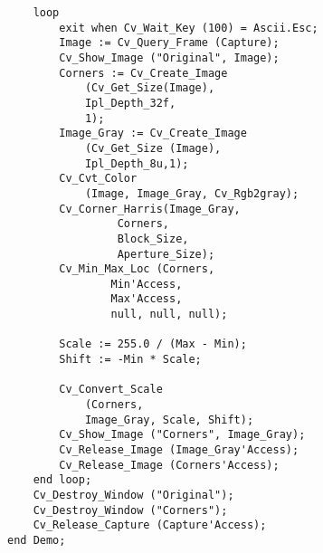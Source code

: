 \begin{lstlisting}
	loop
		exit when Cv_Wait_Key (100) = Ascii.Esc;
		Image := Cv_Query_Frame (Capture);
		Cv_Show_Image ("Original", Image);
		Corners := Cv_Create_Image
			(Cv_Get_Size(Image),
			Ipl_Depth_32f, 
			1);
		Image_Gray := Cv_Create_Image
			(Cv_Get_Size (Image),
			Ipl_Depth_8u,1);
		Cv_Cvt_Color
			(Image, Image_Gray, Cv_Rgb2gray);
		Cv_Corner_Harris(Image_Gray, 
				 Corners, 
				 Block_Size, 
			 	 Aperture_Size);
		Cv_Min_Max_Loc (Corners, 
			   	Min'Access, 
				Max'Access, 
				null, null, null);

		Scale := 255.0 / (Max - Min);
		Shift := -Min * Scale;

		Cv_Convert_Scale 
			(Corners, 
			Image_Gray, Scale, Shift);
		Cv_Show_Image ("Corners", Image_Gray);
		Cv_Release_Image (Image_Gray'Access);
		Cv_Release_Image (Corners'Access);
	end loop;
	Cv_Destroy_Window ("Original");
	Cv_Destroy_Window ("Corners");
	Cv_Release_Capture (Capture'Access);
end Demo;
\end{lstlisting}